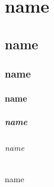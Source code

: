 \documentclass[12pt]{article}
\begin{document}


\\

\\[1.5ex]



\part{name}
\chapter{name}
\section{name}
\subsection{name}
\subsubsection{name}
\paragraph{name}
\subparagraph{name}



\label{sec:name}
\end{document}

